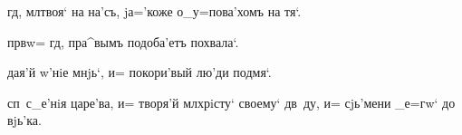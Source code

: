     гд, мл твоя` на 
на'съ, jа='коже о_у=пова'хомъ на тя`.

  прв w= гд, пра^вымъ 
подоба'етъ похвала`.

  дая'й w'нiе мнjь`, и= 
покори'вый лю'ди под\ъ мя`.

  сп~с_е'нiя царе'ва, и= творя'й 
мл хрiсту` своему` дв~ду, и= сjь'мени _е=гw` до 
вjь'ка.
